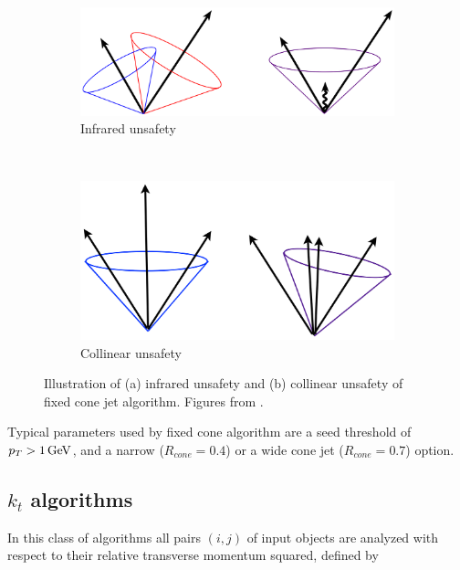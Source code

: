 \begin{figure}[t]
  \centering
  \begin{subfigure}[b]{0.65\textwidth}
    \includegraphics[width=\textwidth]{Chapter2/IRsafety.png}
    \caption{Infrared unsafety}
    \label{fig:IRsafety}
  \end{subfigure}
  ~
  \begin{subfigure}[b]{0.6\textwidth}
    \includegraphics[width=\textwidth]{Chapter2/ColSafety.png}
    \caption{Collinear unsafety}
    \label{fig:ColSafety}
  \end{subfigure}
  \caption{Illustration of (a) infrared unsafety and (b) collinear unsafety
    of fixed cone jet algorithm.
    Figures from \cite{JetTheoreticalPictures}.}
  \label{fig:JetIRCOLsafety}
\end{figure}

Typical parameters used by fixed cone algorithm are a seed threshold of $p_{T} > 1 \,\text{GeV}$,
and a narrow ($R_{cone} = 0.4$) or a wide cone jet ($R_{cone} = 0.7$) option.

\subsection{$k_t$ algorithms}

In this class of algorithms all pairs $(i,j)$ of input objects are analyzed with
respect to their relative transverse momentum squared, defined by 

